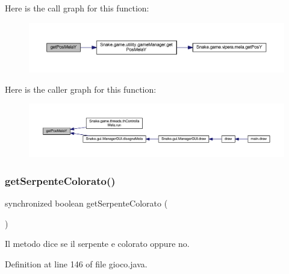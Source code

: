 Here is the call graph for this function\+:
\nopagebreak
\begin{figure}[H]
\begin{center}
\leavevmode
\includegraphics[width=350pt]{class_snake_1_1game_1_1gioco_a705cd114e2c4c31eb74a4107e9a3e1ae_cgraph}
\end{center}
\end{figure}
Here is the caller graph for this function\+:
\nopagebreak
\begin{figure}[H]
\begin{center}
\leavevmode
\includegraphics[width=350pt]{class_snake_1_1game_1_1gioco_a705cd114e2c4c31eb74a4107e9a3e1ae_icgraph}
\end{center}
\end{figure}
\mbox{\label{class_snake_1_1game_1_1gioco_a8285102d15107685676f4ba0b6029d87}} 
\subsubsection{\texorpdfstring{get\+Serpente\+Colorato()}{getSerpenteColorato()}}
{\footnotesize\ttfamily synchronized boolean get\+Serpente\+Colorato (\begin{DoxyParamCaption}{ }\end{DoxyParamCaption})}



Il metodo dice se il serpente e\textquotesingle{} colorato oppure no. 



Definition at line 146 of file gioco.\+java.

